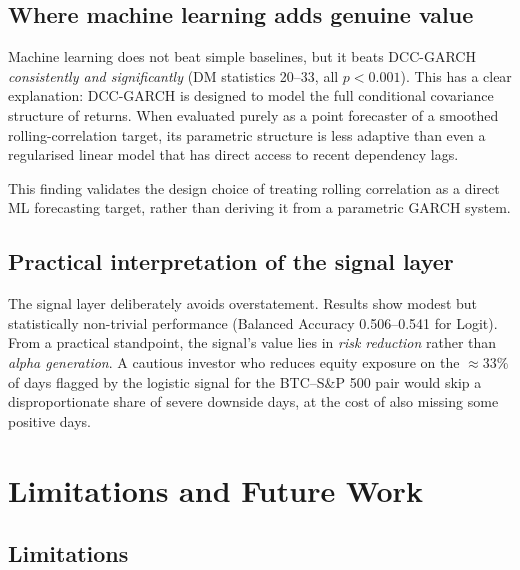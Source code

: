 \documentclass[12pt, a4paper]{article}
\begin{document}
\subsection{Where machine learning adds genuine value}

Machine learning does not beat simple baselines, but it
beats DCC-GARCH \emph{consistently and significantly}
(DM statistics 20–33, all $p < 0.001$).
This has a clear explanation: DCC-GARCH is designed to
model the full conditional covariance structure of returns.
When evaluated purely as a point forecaster of a smoothed
rolling-correlation target, its parametric structure
is less adaptive than even a regularised linear model
that has direct access to recent dependency lags.

This finding validates the design choice of treating rolling
correlation as a direct ML forecasting target, rather than
deriving it from a parametric GARCH system.

\subsection{Practical interpretation of the signal layer}

The signal layer deliberately avoids overstatement.
Results show modest but statistically non-trivial performance
(Balanced Accuracy 0.506–0.541 for Logit).
From a practical standpoint, the signal's value lies in
\emph{risk reduction} rather than \emph{alpha generation}.
A cautious investor who reduces equity exposure on the
$\approx 33\%$ of days flagged by the logistic signal
for the BTC–S\&P 500 pair would skip a disproportionate
share of severe downside days, at the cost of also missing
some positive days.

\section{Limitations and Future Work}

\subsection{Limitations}
\end{document}

